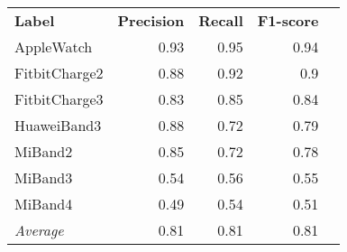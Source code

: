 \begin{tabular}{lrrrr}
    \textbf{Label} & \textbf{Precision} & \textbf{Recall} & \textbf{F1-score} \\
    AppleWatch & 0.93 & 0.95 & 0.94 \\
    FitbitCharge2 & 0.88 & 0.92 & 0.9 \\
    FitbitCharge3 & 0.83 & 0.85 & 0.84 \\
    HuaweiBand3 & 0.88 & 0.72 & 0.79 \\
    MiBand2 & 0.85 & 0.72 & 0.78 \\
    MiBand3 & 0.54 & 0.56 & 0.55 \\
    MiBand4 & 0.49 & 0.54 & 0.51 \\
    \emph{Average} & 0.81 & 0.81 & 0.81 \\
\end{tabular}